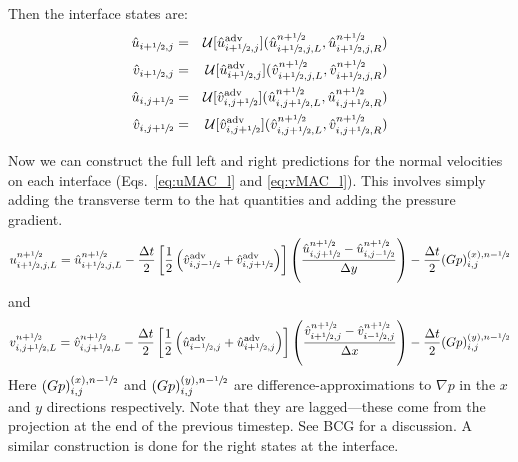 Then the interface states are:
\begin{eqnarray}
\hat{u}_{i+{\sfrac{1}{2}},j} &=& \mathcal{U}[\hat{u}_{i+{\sfrac{1}{2}},j}^\mathrm{adv}]
             (\hat{u}_{i+{\sfrac{1}{2}},j,L}^{n+{\sfrac{1}{2}}}, \hat{u}_{i+{\sfrac{1}{2}},j,R}^{n+{\sfrac{1}{2}}} ) \\
\hat{v}_{i+{\sfrac{1}{2}},j} &=& \mathcal{U}[\hat{u}_{i+{\sfrac{1}{2}},j}^\mathrm{adv}]
             (\hat{v}_{i+{\sfrac{1}{2}},j,L}^{n+{\sfrac{1}{2}}}, \hat{v}_{i+{\sfrac{1}{2}},j,R}^{n+{\sfrac{1}{2}}} ) \\
\hat{u}_{i,j+{\sfrac{1}{2}}} &=& \mathcal{U}[\hat{v}_{i,j+{\sfrac{1}{2}}}^\mathrm{adv}]
             (\hat{u}_{i,j+{\sfrac{1}{2}},L}^{n+{\sfrac{1}{2}}}, \hat{u}_{i,j+{\sfrac{1}{2}},R}^{n+{\sfrac{1}{2}}} ) \\
\hat{v}_{i,j+{\sfrac{1}{2}}} &=& \mathcal{U}[\hat{v}_{i,j+{\sfrac{1}{2}}}^\mathrm{adv}]
             (\hat{v}_{i,j+{\sfrac{1}{2}},L}^{n+{\sfrac{1}{2}}}, \hat{v}_{i,j+{\sfrac{1}{2}},R}^{n+{\sfrac{1}{2}}} ) 
\end{eqnarray}

Now we can construct the full left and right predictions for the
normal velocities on each interface (Eqs.~\ref{eq:uMAC_l} and
\ref{eq:vMAC_l}).  This involves simply adding the transverse term to
the hat quantities and adding the pressure gradient.
\begin{equation}
u_{i+{\sfrac{1}{2}},j,L}^{n+{\sfrac{1}{2}}} = \hat{u}_{i+{\sfrac{1}{2}},j,L}^{n+{\sfrac{1}{2}}} 
    - \frac{\Delta t}{2} 
       \left [ \frac{1}{2} \left (\hat{v}^\mathrm{adv}_{i,j-{\sfrac{1}{2}}} +
                                  \hat{v}^\mathrm{adv}_{i,j+{\sfrac{1}{2}}} \right )
      \right ]
      \left ( \frac{\hat{u}_{i,j+{\sfrac{1}{2}}}^{n+{\sfrac{1}{2}}} - 
                    \hat{u}_{i,j-{\sfrac{1}{2}}}^{n+{\sfrac{1}{2}}}}{\Delta y} \right )
    - \frac{\Delta t}{2} (Gp)^{(x),n-{\sfrac{1}{2}}}_{i,j}
\end{equation}
and
\begin{equation}
v_{i,j+{\sfrac{1}{2}},L}^{n+{\sfrac{1}{2}}} = \hat{v}_{i,j+{\sfrac{1}{2}},L}^{n+{\sfrac{1}{2}}} 
    - \frac{\Delta t}{2} 
       \left [ \frac{1}{2} \left (\hat{u}^\mathrm{adv}_{i-{\sfrac{1}{2}},j} +
                                  \hat{u}^\mathrm{adv}_{i+{\sfrac{1}{2}},j} \right )
      \right ]
      \left ( \frac{\hat{v}_{i+{\sfrac{1}{2}},j}^{n+{\sfrac{1}{2}}} - 
                    \hat{v}_{i-{\sfrac{1}{2}},j}^{n+{\sfrac{1}{2}}}}{\Delta x} \right )
    - \frac{\Delta t}{2} (Gp)^{(y),n-{\sfrac{1}{2}}}_{i,j}
\end{equation}
Here $ (Gp)^{(x),n-{\sfrac{1}{2}}}_{i,j}$ and $ (Gp)^{(y),n-{\sfrac{1}{2}}}_{i,j}$ are
difference-approximations to $\nabla p$ in the $x$ and $y$
directions respectively.  Note that they are lagged---these come from
the projection at the end of the previous timestep.  See BCG for
a discussion.  A similar
construction is done for the right states at the interface.

